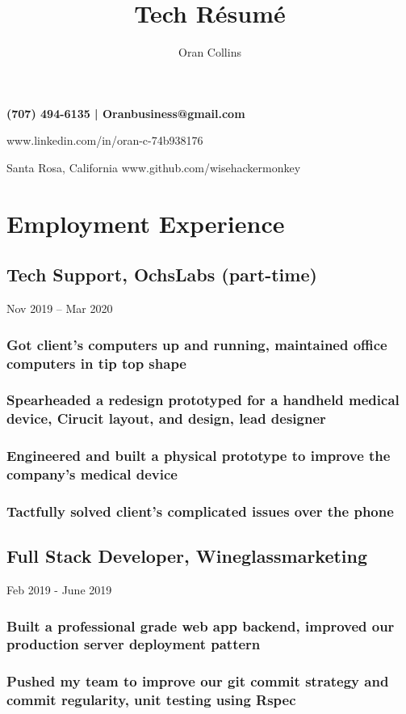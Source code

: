 \documentclass{article}
\makeatletter
\renewcommand{\maketitle}{
\begin{flushleft}
\bfseries
{\Huge\theauthor}\hfill
(707) 494-6135 |  Oranbusiness@gmail.com

\hfill www.linkedin.com/in/oran-c-74b938176

{\hspace{1mm}Santa Rosa, California}\hfill 
www.github.com/wisehackermonkey

\end{flushleft}
}
\makeatother
\begin{document}
\title{Tech R\'esum\'e}
\author{Oran Collins}


\maketitle

\section{Employment Experience}
	 \subsection{Tech Support, OchsLabs (part-time)} Nov 2019 – Mar 2020
        
        \vspace{-2mm}
    	\subsubsection{Got client's computers up and running, maintained office computers in tip top shape}
        \subsubsection{Spearheaded a redesign prototyped for a handheld medical device, Cirucit layout, and design, lead designer }
    	\subsubsection{Engineered and built a physical prototype to improve the company's medical device}

    	\subsubsection{Tactfully solved client's complicated issues over the phone}
    	

    \subsection{Full Stack Developer, Wineglassmarketing}Feb 2019 - June 2019
	        \vspace{-2mm}
	        \subsubsection{Built a professional grade web app backend, improved our production server deployment pattern}
            \subsubsection{Pushed my team to improve our git commit strategy and commit regularity, unit testing using Rspec}
\end{document}
